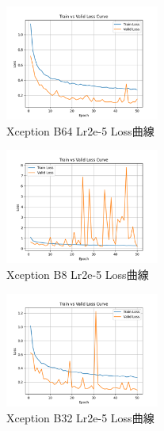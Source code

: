 \begin{figure}[!ht]
    \centering
    \includegraphics[width=0.45\textwidth]{./img/Xception/P3.png}
    \caption{Xception B64 Lr2e-5 Loss曲線}
    \label{fig:Xception_P3}
\end{figure}
\begin{figure}[!ht]
    \centering
    \includegraphics[width=0.45\textwidth]{./img/Xception/P4.png}
    \caption{Xception B8 Lr2e-5 Loss曲線}
    \label{fig:Xception_P4}
\end{figure}
\begin{figure}[!ht]
    \centering
    \includegraphics[width=0.45\textwidth]{./img/Xception/P5.png}
    \caption{Xception B32 Lr2e-5 Loss曲線}
    \label{fig:Xception_P5}
\end{figure}
%
\FloatBarrier

